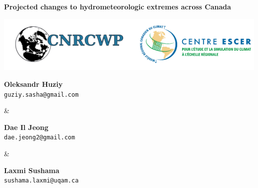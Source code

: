 \documentclass[a0,landscape]{a0poster}
\begin{document}


\noindent\begin{minipage}[b]{\linewidth}
\centering
\noindent \veryHuge \color{NavyBlue} \textbf{Projected changes to hydrometeorologic extremes across Canada} \color{Black}\\ %
\noindent\begin{minipage}[c]{0.2\linewidth}
      \center
      \includegraphics[width=25cm]{logo_cnrcwp_escer.png} %
\end{minipage} \hfill
%
\begin{minipage}[c]{0.15\linewidth}
  \center
  \Large \textbf{Oleksandr Huziy} \\
  \large \texttt{guziy.sasha@gmail.com}
\end{minipage}
%
\begin{minipage}[b]{0.01\linewidth}
 \center
 \Large\&
\end{minipage}
%
\begin{minipage}[c]{0.15\linewidth}
   \center
   \Large \textbf{Dae Il Jeong} \\
   \large  \texttt{dae.jeong2@gmail.com}
\end{minipage}\hfill
%
\begin{minipage}[b]{0.01\linewidth}
 \center
 \Large\&
\end{minipage}
%
\begin{minipage}[c]{0.15\linewidth}
   \center
   \Large \textbf{Laxmi Sushama} \\
   \large  \texttt{sushama.laxmi@uqam.ca}
\end{minipage}\hfill
%

\end{minipage}
\end{document}
